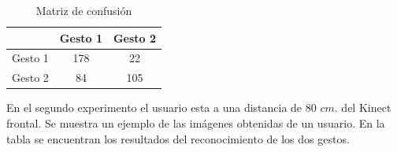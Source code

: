 \begin{table}[h!] 
\begin{center}
\begin{tabular}{ r || c | c |} 
 
        & Gesto 1 & Gesto 2 \\ \hline \hline  
Gesto 1 & 178    &  22     \\ \hline  
Gesto 2 & 84     & 105     \\   

\end{tabular}
\end{center} 
\caption{Matriz de confusión}
\end{table}


En el segundo experimento el usuario esta a una distancia de $80$ $cm.$ del Kinect frontal. Se muestra un ejemplo de las imágenes obtenidas de un usuario. En la tabla se encuentran los resultados del reconocimiento de los dos gestos.   

